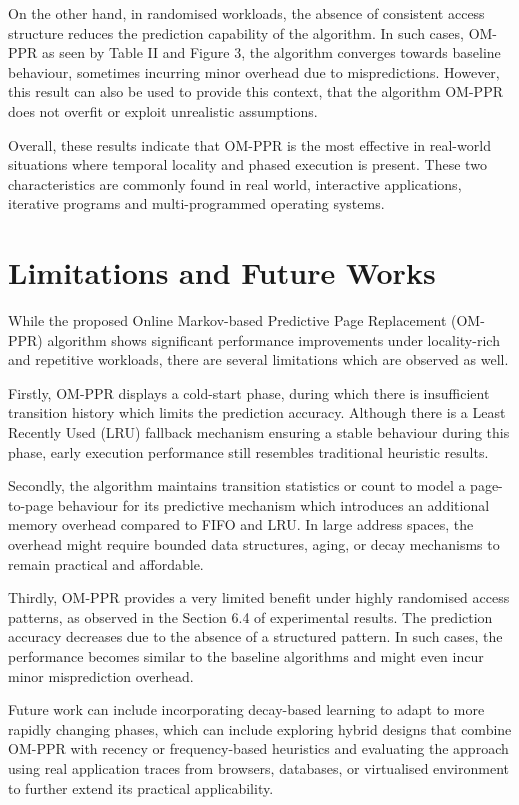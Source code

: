 \documentclass[conference]{IEEEtran}
\begin{document}
On the other hand, in randomised workloads, the absence of consistent access structure reduces the prediction capability of the algorithm. In such cases, OM-PPR as seen by Table II and Figure 3, the algorithm converges towards baseline behaviour, sometimes incurring minor overhead due to mispredictions. However, this result can also be used to provide this context, that the algorithm OM-PPR does not overfit or exploit unrealistic assumptions.

Overall, these results indicate that OM-PPR is the most effective in real-world situations where temporal locality and phased execution is present. These two characteristics are commonly found in real world, interactive applications, iterative programs and multi-programmed operating systems.
\vspace{0.7\baselineskip}


\section{\textbf{Limitations and Future Works}}

While the proposed Online Markov-based Predictive Page Replacement (OM-PPR) algorithm shows significant performance improvements under locality-rich and repetitive workloads, there are several limitations which are observed as well.

Firstly, OM-PPR displays a cold-start phase, during which there is insufficient transition history which limits the prediction accuracy. Although there is a Least Recently Used (LRU) fallback mechanism ensuring a stable behaviour during this phase, early execution performance still resembles traditional heuristic results.

Secondly, the algorithm maintains transition statistics or count to model a page-to-page behaviour for its predictive mechanism which introduces an additional memory overhead compared to FIFO and LRU. In large address spaces, the overhead might require bounded data structures, aging, or decay mechanisms to remain practical and affordable.

Thirdly, OM-PPR provides a very limited benefit under highly randomised access patterns, as observed in the Section 6.4 of experimental results. The prediction accuracy decreases due to the absence of a structured pattern. In such cases, the performance becomes similar to the baseline algorithms and might even incur minor misprediction overhead.

Future work can include incorporating decay-based learning to adapt to more rapidly changing phases, which can include exploring hybrid designs that combine OM-PPR with recency or frequency-based heuristics and evaluating the approach using real application traces from browsers, databases, or virtualised environment to further extend its practical applicability.
\vspace{0.7\baselineskip}
\end{document}
